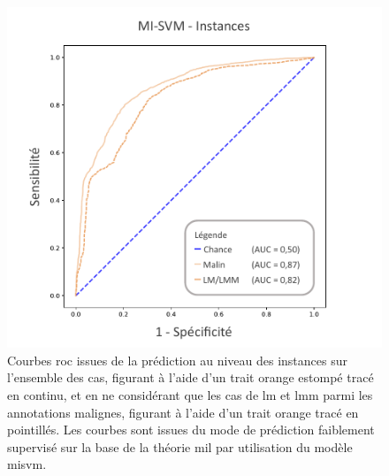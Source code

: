 \begin{figure}[H]
    \centering
    \includegraphics[width=0.8\linewidth]{contents/chapter_7/resources/results_lesion_roc_instances.pdf}
    \caption{Courbes \gls{roc} issues de la prédiction au niveau des instances sur l'ensemble des cas, figurant à l'aide d'un trait orange estompé tracé en continu, et en ne considérant que les cas de \gls{lm} et \gls{lmm} parmi les annotations malignes, figurant à l'aide d'un trait orange tracé en pointillés. Les courbes sont issues du mode de prédiction faiblement supervisé sur la base de la théorie \gls{mil} par utilisation du modèle \gls{misvm}.}
    \label{fig:results_lesion_roc_instances}
\end{figure}\par

